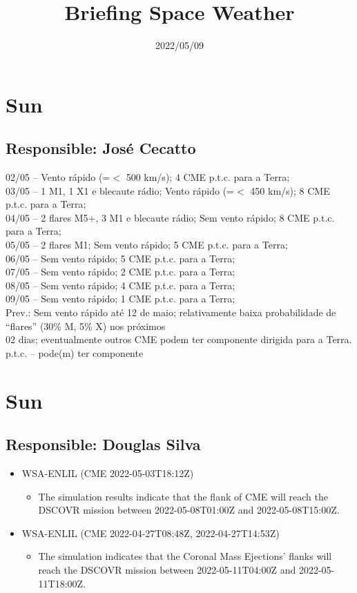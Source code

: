 \documentclass[11pt, oneside]{article}
\title{Briefing Space Weather}
\date{2022/05/09}
\begin{document}
\maketitle 

 \section{Sun} 
 \subsection{Responsible: José Cecatto}

02/05 – Vento rápido (=$<$ 500 km/s); 4 CME p.t.c. para a Terra; \\ 03/05 – 1 M1, 1 X1 e blecaute rádio; Vento rápido (=$<$ 450 km/s); 8 CME p.t.c. para a Terra; \\ 04/05 – 2 flares M5+, 3 M1 e blecaute rádio; Sem vento rápido; 8 CME p.t.c. para a Terra;  \\ 05/05 – 2 flares M1; Sem vento rápido; 5 CME p.t.c. para a Terra;  \\ 06/05 – Sem vento rápido; 5 CME p.t.c. para a Terra; \\ 07/05 – Sem vento rápido; 2 CME p.t.c. para a Terra; \\ 08/05 – Sem vento rápido; 4 CME p.t.c. para a Terra; \\ 09/05 – Sem vento rápido; 1 CME p.t.c. para a Terra; \\ Prev.: Sem vento rápido até 12 de maio; relativamente baixa probabilidade de “flares” (30\% M, 5\% X) nos próximos \\ 02 dias; eventualmente outros CME podem ter componente dirigida para a Terra. \\ p.t.c. – pode(m) ter componente\section{Sun} 
 \subsection{Responsible: Douglas Silva}

\begin{itemize} 
 \item WSA-ENLIL (CME 2022-05-03T18:12Z)
\begin{itemize} 
 \item The simulation results indicate that the flank of CME will reach the DSCOVR mission between 2022-05-08T01:00Z and 2022-05-08T15:00Z.
\end{itemize} 
 \item WSA-ENLIL (CME 2022-04-27T08:48Z, 2022-04-27T14:53Z)
\begin{itemize} 
 \item The simulation indicates that the Coronal Mass Ejections’ flanks will reach the DSCOVR mission between 2022-05-11T04:00Z and 2022-05-11T18:00Z. 
\end{itemize} 
 \end{itemize} 
 
\end{document}

